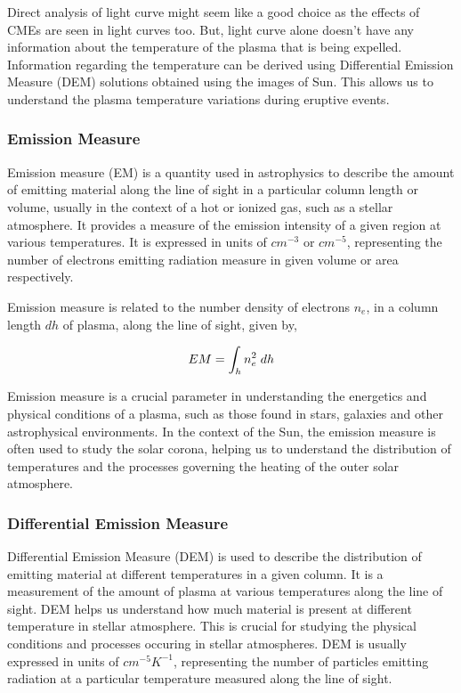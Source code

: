 Direct analysis of light curve might seem like a good choice as the effects of CMEs are seen in light curves too. But, light curve alone doesn't have any information about the temperature of the plasma that is being expelled. Information regarding the temperature can be derived using Differential Emission Measure (DEM) solutions obtained using the images of Sun. This allows us to understand the plasma temperature variations during eruptive events.

\subsubsection{Emission Measure}

Emission measure (EM) is a quantity used in astrophysics to describe the amount of emitting material along the line of sight in a particular column length or volume, usually in the context of a hot or ionized gas, such as a stellar atmosphere. It provides a measure of the emission intensity of a given region at various temperatures. It is expressed in units of $cm^{-3}$ or $cm^{-5}$, representing the number of electrons  emitting radiation measure in given volume or area respectively.

Emission measure is related to the number density of electrons $n_e$, in a column length $dh$ of plasma, along the line of sight, given by,

\vspace{-0.75cm}
\begin{center}
    \begin{equation}
        EM = \int_h n_e^2 \hspace{0.1cm} dh
    \end{equation}
\end{center}

Emission measure is a crucial parameter in understanding the energetics and physical conditions of a plasma, such as those found in stars, galaxies and other astrophysical environments. In the context of the Sun, the emission measure is often used to study the solar corona, helping us to understand the distribution of temperatures and the processes governing the heating of the outer solar atmosphere.

\subsubsection{Differential Emission Measure}

Differential Emission Measure (DEM) is used to describe the distribution of emitting material at different temperatures in a given column. It is a measurement of the amount of plasma at various temperatures along the line of sight. DEM helps us understand how much material is present at different temperature in stellar atmosphere. This is crucial for studying the physical conditions and processes occuring in stellar atmospheres. DEM is usually expressed in units of $cm^{-5}K^{-1}$, representing the number of particles emitting radiation at a particular temperature measured along the line of sight.

